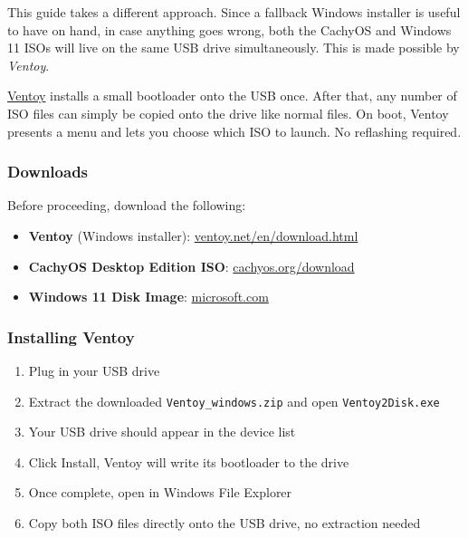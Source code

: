 \documentclass{article}
\newcommand{\code}[1]{\colorbox{codebg}{\texttt{#1}}}
\begin{document}
\noindent This guide takes a different approach. Since a fallback Windows installer is useful to have on hand, in case anything goes wrong, both the CachyOS and Windows 11
ISOs will live on the same USB drive simultaneously. This is made possible by \textit{Ventoy}.

\href{https://www.ventoy.net}{Ventoy} installs a small bootloader onto the USB once.
After that, any number of ISO files can simply be copied onto the drive like normal
files. On boot, Ventoy presents a menu and lets you choose which ISO to launch.
No reflashing required.

\subsubsection{Downloads}

Before proceeding, download the following:

\begin{itemize}[nosep, leftmargin=1.5em, label={\tiny\textbullet}]
  \item \textbf{Ventoy} (Windows installer):
    \href{https://www.ventoy.net/en/download.html}{ventoy.net/en/download.html}
  \item \textbf{CachyOS Desktop Edition ISO}:
    \href{https://cachyos.org/download/}{cachyos.org/download}
  \item \textbf{Windows 11 Disk Image}:
    \href{https://www.microsoft.com/en-us/software-download/windows11}{microsoft.com}
\end{itemize}

\subsubsection{Installing Ventoy}

\begin{enumerate}[nosep, leftmargin=1.5em, label={\arabic*.}]
  \item Plug in your USB drive
  \item Extract the downloaded \code{Ventoy\_windows.zip} and open
    \code{Ventoy2Disk.exe}
  \item Your USB drive should appear in the device list
  \item Click Install, Ventoy will write its bootloader to the drive
  \item Once complete, open  in Windows File Explorer
  \item Copy both ISO files directly onto the USB drive, no extraction needed
\end{enumerate}
\end{document}
